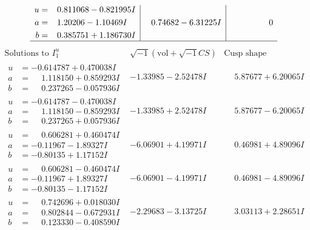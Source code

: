 \documentclass[1p]{elsarticle_modified}
\theoremstyle{definition}
\newcommand{\I}{\sqrt{-1}}
\begin{document}
$$\begin{array}{c|c|c}
\begin{aligned}
u &= \phantom{-}0.811068 - 0.821995 I \\
a &= \phantom{-}1.20206 - 1.10469 I \\
b &= \phantom{-}0.385751 + 1.186730 I\end{aligned}
 & \phantom{-}0.74682 - 6.31225 I & \phantom{-0.000000 } 0\\
 \hline 
 \end{array}$$\newpage$$\begin{array}{c|c|c}  
\text{Solutions to }I^u_{1}& \I (\text{vol} + \sqrt{-1}CS) & \text{Cusp shape}\\
 \hline 
\begin{aligned}
u &= -0.614787 + 0.470038 I \\
a &= \phantom{-}1.118150 + 0.859293 I \\
b &= \phantom{-}0.237265 - 0.057936 I\end{aligned}
 & -1.33985 - 2.52478 I & \phantom{-}5.87677 + 6.20065 I \\ \hline\begin{aligned}
u &= -0.614787 - 0.470038 I \\
a &= \phantom{-}1.118150 - 0.859293 I \\
b &= \phantom{-}0.237265 + 0.057936 I\end{aligned}
 & -1.33985 + 2.52478 I & \phantom{-}5.87677 - 6.20065 I \\ \hline\begin{aligned}
u &= \phantom{-}0.606281 + 0.460474 I \\
a &= -0.11967 - 1.89327 I \\
b &= -0.80135 + 1.17152 I\end{aligned}
 & -6.06901 + 4.19971 I & \phantom{-}0.46981 + 4.89096 I \\ \hline\begin{aligned}
u &= \phantom{-}0.606281 - 0.460474 I \\
a &= -0.11967 + 1.89327 I \\
b &= -0.80135 - 1.17152 I\end{aligned}
 & -6.06901 - 4.19971 I & \phantom{-}0.46981 - 4.89096 I \\ \hline\begin{aligned}
u &= \phantom{-}0.742696 + 0.018030 I \\
a &= \phantom{-}0.802844 - 0.672931 I \\
b &= \phantom{-}0.123330 - 0.408590 I\end{aligned}
 & -2.29683 - 3.13725 I & \phantom{-}3.03113 + 2.28651 I \\ \hline\begin{aligned}

\end{aligned}
\end{array}$$
\end{document}
